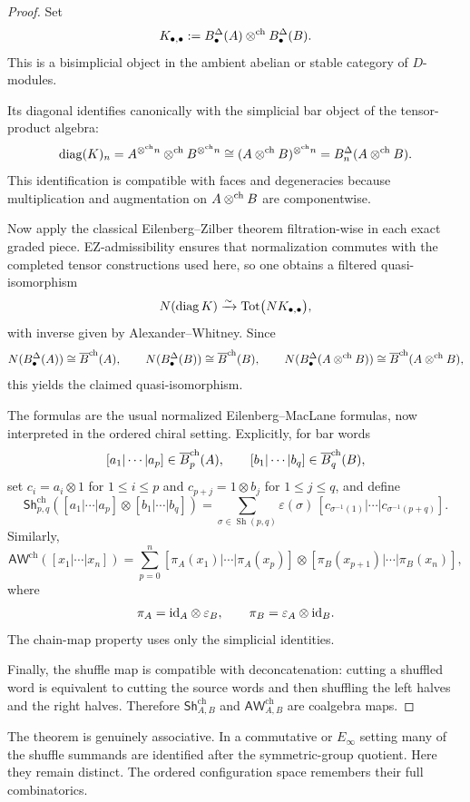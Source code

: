 \begin{proof}
Set
\[
K_{\bullet,\bullet}:=B^\Delta_\bullet(A)\mathbin{\otimes^{\mathrm{ch}}} B^\Delta_\bullet(B).
\]
This is a bisimplicial object in the ambient abelian or stable category of $D$-modules.

Its diagonal identifies canonically with the simplicial bar object of the tensor-product algebra:
\[
\operatorname{diag}(K)_n
=
A^{\mathbin{\otimes^{\mathrm{ch}}} n}\mathbin{\otimes^{\mathrm{ch}}} B^{\mathbin{\otimes^{\mathrm{ch}}} n}
\cong
(A\mathbin{\otimes^{\mathrm{ch}}} B)^{\mathbin{\otimes^{\mathrm{ch}}} n}
=
B^\Delta_n(A\mathbin{\otimes^{\mathrm{ch}}} B).
\]
This identification is compatible with faces and degeneracies because multiplication and augmentation
on $A\mathbin{\otimes^{\mathrm{ch}}} B$ are componentwise.

Now apply the classical Eilenberg--Zilber theorem filtration-wise in each exact graded piece.
EZ-admissibility ensures that normalization commutes with the completed tensor constructions used
here, so one obtains a filtered quasi-isomorphism
\[
N(\operatorname{diag}K)\xrightarrow{\sim} \operatorname{Tot}\bigl(NK_{\bullet,\bullet}\bigr),
\]
with inverse given by Alexander--Whitney. Since
\[
N(B^\Delta_\bullet(A))\cong \overline{B}^{\mathrm{ch}}(A),
\qquad
N(B^\Delta_\bullet(B))\cong \overline{B}^{\mathrm{ch}}(B),
\qquad
N(B^\Delta_\bullet(A\mathbin{\otimes^{\mathrm{ch}}} B))\cong \overline{B}^{\mathrm{ch}}(A\mathbin{\otimes^{\mathrm{ch}}} B),
\]
this yields the claimed quasi-isomorphism.

The formulas are the usual normalized Eilenberg--MacLane formulas, now interpreted in the ordered
chiral setting. Explicitly, for bar words
\[
[a_1|\cdots|a_p]\in \overline{B}^{\mathrm{ch}}_p(A),\qquad [b_1|\cdots|b_q]\in \overline{B}^{\mathrm{ch}}_q(B),
\]
set $c_i=a_i\otimes 1$ for $1\leq i\leq p$ and $c_{p+j}=1\otimes b_j$ for $1\leq j\leq q$, and define
\[
\mathsf{Sh}^{\mathrm{ch}}_{p,q}
([a_1|\cdots|a_p]\otimes[b_1|\cdots|b_q])
=
\sum_{\sigma\in \operatorname{Sh}(p,q)}
\varepsilon(\sigma)\,
[c_{\sigma^{-1}(1)}|\cdots|c_{\sigma^{-1}(p+q)}].
\]
Similarly,
\[
\mathsf{AW}^{\mathrm{ch}}([x_1|\cdots|x_n])
=
\sum_{p=0}^n
[\pi_A(x_1)|\cdots|\pi_A(x_p)]\otimes[\pi_B(x_{p+1})|\cdots|\pi_B(x_n)],
\]
where
\[
\pi_A=\mathrm{id}_A\otimes \varepsilon_B,\qquad \pi_B=\varepsilon_A\otimes \mathrm{id}_B.
\]
The chain-map property uses only the simplicial identities.

Finally, the shuffle map is compatible with deconcatenation: cutting a shuffled word is equivalent to
cutting the source words and then shuffling the left halves and the right halves. Therefore
$\mathsf{Sh}^{\mathrm{ch}}_{A,B}$ and $\mathsf{AW}^{\mathrm{ch}}_{A,B}$ are coalgebra maps.
\end{proof}

\begin{remark}
The theorem is genuinely associative. In a commutative or $E_\infty$ setting many of the shuffle
summands are identified after the symmetric-group quotient. Here they remain distinct. The ordered
configuration space remembers their full combinatorics.
\end{remark}

